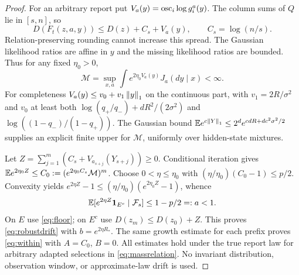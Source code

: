 \begin{proof}
For an arbitrary report put $V_a(y)=\operatorname{osc}_i\log g_i^a(y)$. The column sums of $Q$ lie in $[s,n]$, so
\[
 D(F_t(z,a,y))\le D(z)+C_s+V_a(y),\qquad C_s=\log(n/s).
\]
Relation-preserving rounding cannot increase this spread. The Gaussian likelihood ratios are affine in $y$ and the missing likelihood ratios are bounded. Thus for any fixed $\eta_0>0$,
\[
 \mathcal M=\sup_{x,a}\int e^{2\eta_0 V_a(y)}J_a(dy\mid x)<\infty.
\]
For completeness $V_a(y)\le v_0+v_1\left\lVert y\right\rVert_1$ on the continuous part, with $v_1=2R/\sigma^2$ and $v_0$ at least both
$\log(q_+/q_-)+dR^2/(2\sigma^2)$ and
$\log((1-q_-)/(1-q_+))$.
The Gaussian bound $\mathbb E e^{c\left\lVert Y\right\rVert_1}\le2^d e^{cdR+dc^2\sigma^2/2}$ supplies an explicit finite upper for $\mathcal M$, uniformly over hidden-state mixtures.

Let $Z=\sum_{j=1}^m(C_s+V_{a_{s+j}}(Y_{s+j}))\ge0$. Conditional iteration gives
$\mathbb E e^{2\eta_0 Z}\le C_0:=(e^{2\eta_0 C_s}\mathcal M)^m$.
Choose $0<\eta\le\eta_0$ with
$(\eta/\eta_0)(C_0-1)\le p/2$.
Convexity yields $e^{2\eta Z}-1\le(\eta/\eta_0)(e^{2\eta_0 Z}-1)$, whence
\[
 \mathbb E[e^{2\eta Z}\mathbf 1_{E^c}\mid\mathcal F_s]\le1-p/2=:a<1.
\]
On $E$ use \eqref{eq:floor}; on $E^c$ use $D(z_m)\le D(z_0)+Z$. This proves \eqref{eq:robustdrift} with $b=e^{2\eta R_*}$. The same growth estimate for each prefix proves \eqref{eq:within} with $A=C_0$, $B=0$. All estimates hold under the true report law for arbitrary adapted selections in \eqref{eq:massrelation}. No invariant distribution, observation window, or approximate-law drift is used.
\end{proof}

